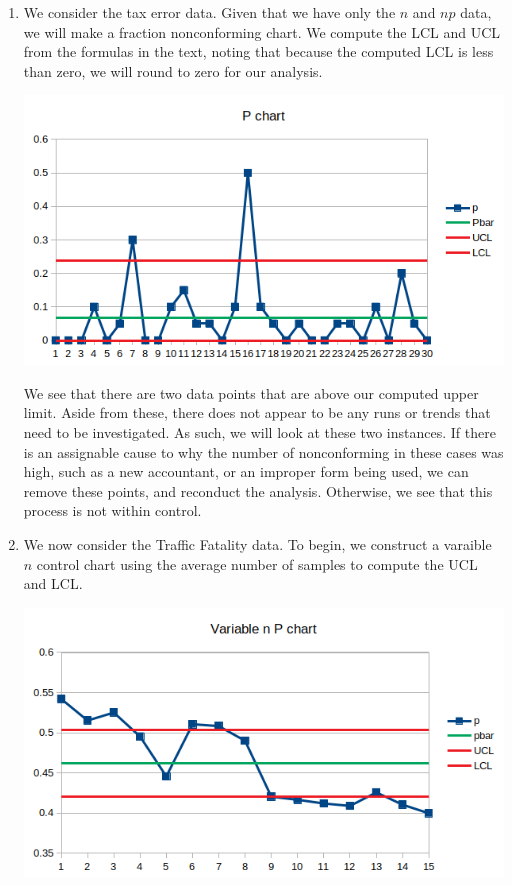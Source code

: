 \documentclass[letterpaper,10pt]{article}
\begin{document}
\begin{enumerate}
\item We consider the tax error data. Given that we have only the $n$ and $np$ data, we will make a fraction nonconforming chart. We compute the LCL and UCL from the formulas in the text, noting that because the computed LCL is less than zero, we will round to zero for our analysis.
\begin{center}
\includegraphics[scale=1]{1pchart.png}
\end{center}
We see that there are two data points that are above our computed upper limit. Aside from these, there does not appear to be any runs or trends that need to be investigated. As such, we will look at these two instances. If there is an assignable cause to why the number of nonconforming in these cases was high, such as a new accountant, or an improper form being used, we can remove these points, and reconduct the analysis. Otherwise, we see that this process is not within control.
\item We now consider the Traffic Fatality data. To begin, we construct a varaible $n$ control chart using the average number of samples to compute the UCL and LCL.
\begin{center}
\includegraphics[scale=1]{2a.png}

\end{center}
\end{enumerate}
\end{document}

